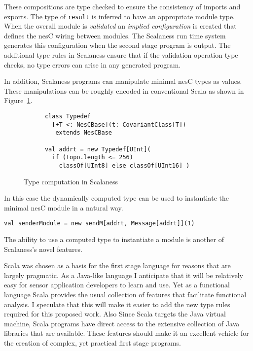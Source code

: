 \documentclass{article}
\begin{document}
These compositions are type checked to ensure the consistency of imports and exports. The type
of \texttt{result} is inferred to have an appropriate module type. When the overall module is
\textit{validated} \cite{nesT} an \textit{implied configuration} is created that defines the
nesC wiring between modules. The Scalaness run time system generates this configuration when the
second stage program is output. The additional type rules in Scalaness ensure that if the
validation operation type checks, no type errors can arise in any generated program.

In addition, Scalaness programs can manipulate minimal nesC types as values. These manipulations
can be roughly encoded in conventional Scala as shown in Figure~\ref{fig:type-computation}.

\begin{figure}[htbp]
  \centering
  \begin{bigbox}
    \begin{lstlisting}
      class Typedef
        [+T <: NesCBase](t: CovariantClass[T])
         extends NesCBase

      val addrt = new Typedef[UInt](
        if (topo.length <= 256)
          classOf[UInt8] else classOf[UInt16] )
    \end{lstlisting}
  \end{bigbox}
  \caption{Type computation in Scalaness}
  \label{fig:type-computation}
\end{figure}

In this case the dynamically computed type can be used to instantiate the minimal nesC module in
a natural way.
\begin{lstlisting}
val senderModule = new sendM[addrt, Message[addrt]](1)
\end{lstlisting}

The ability to use a computed type to instantiate a module is another of Scalaness's novel
features.

Scala was chosen as a basis for the first stage language for reasons that are largely pragmatic.
As a Java-like language I anticipate that it will be relatively easy for sensor application
developers to learn and use. Yet as a functional language Scala provides the usual collection of
features that facilitate functional analysis. I speculate that this will make it easier to add
the new type rules required for this proposed work. Also Since Scala targets the Java virtual
machine, Scala programs have direct access to the extensive collection of Java libraries that
are available. These features should make it an excellent vehicle for the creation of complex,
yet practical first stage programs.
\end{document}
